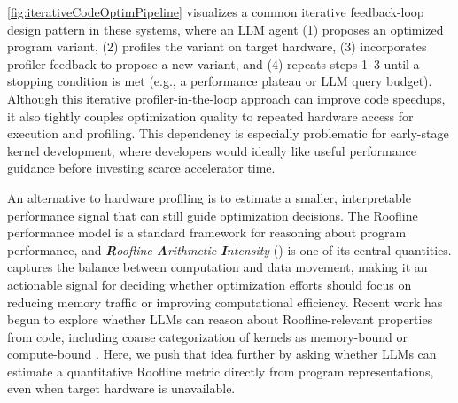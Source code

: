 \autoref{fig:iterativeCodeOptimPipeline} visualizes a common iterative feedback-loop design pattern in these systems, where an LLM agent (1) proposes an optimized program variant, (2) profiles the variant on target hardware, (3) incorporates profiler feedback to propose a new variant, and (4) repeats steps 1--3 until a stopping condition is met (e.g., a performance plateau or LLM query budget). 
Although this iterative profiler-in-the-loop approach can improve code speedups, it also tightly couples optimization quality to repeated hardware access for execution and profiling. 
This dependency is especially problematic for early-stage kernel development, where developers would ideally like useful performance guidance before investing scarce accelerator time.

An alternative to hardware profiling is to estimate a smaller, interpretable performance signal that can still guide optimization decisions. 
The Roofline performance model \cite{samuelwilliamsRooflineInsightfulVisual2009} is a standard framework for reasoning about program performance, and \textit{\textbf{R}oofline \textbf{A}rithmetic \textbf{I}ntensity} (\textbf{\rai}) is one of its central quantities. 
\rai captures the balance between computation and data movement, making it an actionable signal for deciding whether optimization efforts should focus on reducing memory traffic or improving computational efficiency. 
Recent work has begun to explore whether LLMs can reason about Roofline-relevant properties from code, including coarse categorization of kernels as memory-bound or compute-bound \cite{boletCanLargeLanguage2025}. 
Here, we push that idea further by asking whether LLMs can estimate a quantitative Roofline metric directly from program representations, even when target hardware is unavailable.

